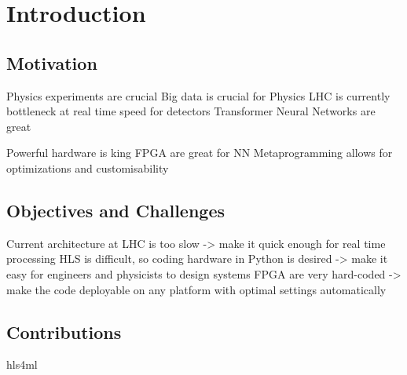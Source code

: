 \chapter{Introduction}

\section{Motivation}
Physics experiments are crucial
Big data is crucial for Physics
LHC is currently bottleneck at real time speed for detectors
Transformer Neural Networks are great

Powerful hardware is king
FPGA are great for NN
Metaprogramming allows for optimizations and customisability

\section{Objectives and Challenges}
Current architecture at LHC is too slow -> make it quick enough for real time processing
HLS is difficult, so coding hardware in Python is desired -> make it easy for engineers and physicists to design systems
FPGA are very hard-coded -> make the code deployable on any platform with optimal settings automatically

\section{Contributions}
hls4ml
